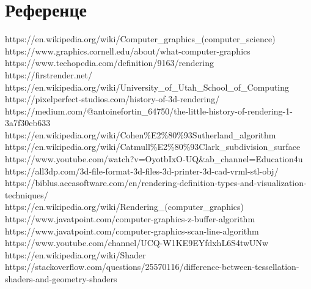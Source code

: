 \documentclass[12pt]{article}
\begin{document}
	\section{Референце}
	https://en.wikipedia.org/wiki/Computer\_graphics\_(computer\_science)\\
	https://www.graphics.cornell.edu/about/what-computer-graphics\\
	https://www.techopedia.com/definition/9163/rendering\\
	https://firstrender.net/\\
	https://en.wikipedia.org/wiki/University\_of\_Utah\_School\_of\_Computing\\
	https://pixelperfect-studios.com/history-of-3d-rendering/\\
	https://medium.com/@antoinefortin\_64750/the-little-history-of-rendering-1-3a7f30cb633\\
	https://en.wikipedia.org/wiki/Cohen\%E2\%80\%93Sutherland\_algorithm\\
	https://en.wikipedia.org/wiki/Catmull\%E2\%80\%93Clark\_subdivision\_surface\\
	https://www.youtube.com/watch?v=OyotbIxO-UQ\&ab\_channel=Education4u\\
	https://all3dp.com/3d-file-format-3d-files-3d-printer-3d-cad-vrml-stl-obj/\\
	https://biblus.accasoftware.com/en/rendering-definition-types-and-visualization-techniques/\\
	https://en.wikipedia.org/wiki/Rendering\_(computer\_graphics)\\
	https://www.javatpoint.com/computer-graphics-z-buffer-algorithm\\
	https://www.javatpoint.com/computer-graphics-scan-line-algorithm\\
	https://www.youtube.com/channel/UCQ-W1KE9EYfdxhL6S4twUNw\\
	https://en.wikipedia.org/wiki/Shader\\
	https://stackoverflow.com/questions/25570116/difference-between-tessellation-shaders-and-geometry-shaders\\
	
\end{document}
